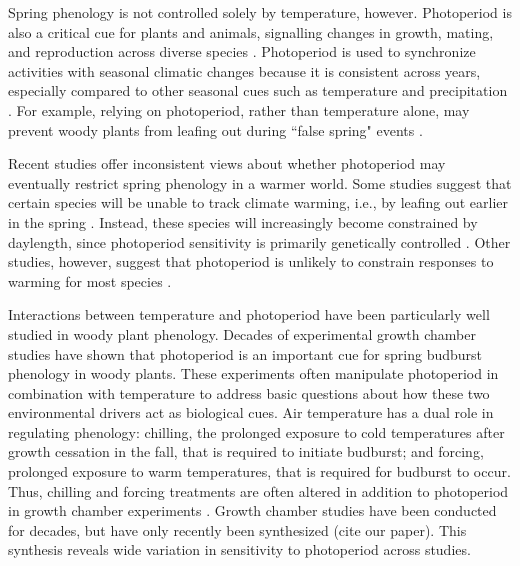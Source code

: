 \documentclass{article}
\begin{document}
\par Spring phenology is not controlled solely by temperature, however. Photoperiod is also a critical cue for plants and animals, signalling changes in growth, mating, and reproduction across diverse species \citep[e.g.,][]{Howe:1996,flynn2018,solbakken1994,mcallan2006,lagercrantz2009}. Photoperiod is used to synchronize activities with seasonal climatic changes \citep[e.g.,][]{Hsu:2011,Singh:2017,Basler:2012} because it is consistent across years, especially compared to other seasonal cues such as temperature and precipitation \citep{saikkonen2012}. For example, relying on photoperiod, rather than temperature alone, may prevent woody plants from leafing out during ``false spring" events \citep[unusually warm periods during winter that are followed by a return of cold temperatures][] {Gu2008}. 

\par Recent studies offer inconsistent views about whether photoperiod may eventually restrict spring phenology in a warmer world. Some studies suggest that certain species will be unable to track climate warming, i.e., by leafing out earlier in the spring \citep{koerner2010b,way2015}. Instead, these species will increasingly become constrained by daylength, since photoperiod sensitivity is primarily genetically controlled \citep{bradshaw2008}. Other studies, however, suggest that photoperiod is unlikely to constrain responses to warming for most species \citep{zohner2016,chuine2010}.

\par Interactions between temperature and photoperiod have been particularly well studied in woody plant phenology. Decades of experimental growth chamber studies have shown that photoperiod is an important cue for spring budburst phenology in woody plants. These experiments often manipulate photoperiod in combination with temperature to address basic questions about how these two environmental drivers act as biological cues. Air temperature has a dual role in regulating phenology: chilling, the prolonged exposure to cold temperatures after growth cessation in the fall, that is required to initiate budburst; and forcing, prolonged exposure to warm temperatures, that is required for budburst to occur. Thus, chilling and forcing treatments are often altered in addition to photoperiod in growth chamber experiments \citep[e.g.,][]{Campbell:1975aa,HEIDE:1977aa,Falusi:1990aa,Spann:2004aa,Laube:2014a}. Growth chamber studies have been conducted for decades, but have only recently been synthesized (cite our paper). This synthesis reveals wide variation in sensitivity to photoperiod across studies. 
\end{document}
